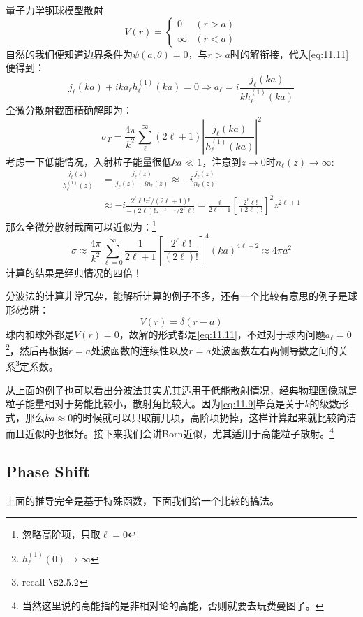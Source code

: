 \documentclass[a4paper,zihao=-4,linespread=1]{ctexrep}
\begin{document}
	\begin{example}{量子力学钢球模型散射}
		\[V(r)=\begin{cases}
			0&(r>a)\\
			\infty &(r<a)
		\end{cases}\]
		自然的我们便知道边界条件为$\psi(a,\theta)=0$，与$r>a$时的解衔接，代入\ref{eq:11.11}便得到：
		\[j_\ell(ka)+ika_\ell h^{(1)}_\ell(ka)=0\Rightarrow a_\ell=i\frac{j_\ell(ka)}{kh_\ell^{(1)}(ka)}\]
		全微分散射截面精确解即为：
		\[\sigma_T=\frac{4\pi}{k^2}\sum_\ell^\infty(2\ell+1)\left|\frac{j_\ell(ka)}{h_\ell^{(1)}(ka)}\right|^2\]
		考虑一下低能情况，入射粒子能量很低$ka\ll1$，注意到$z\to 0$时$n_\ell(z)\to\infty$:
		\begin{equation*}
			\begin{aligned}
				\frac{j_{\ell}(z)}{h_{\ell}^{(1)}(z)} & =\frac{j_{\ell}(z)}{j_{\ell}(z)+i n_{\ell}(z)} \approx-i \frac{j_{\ell}(z)}{n_{\ell}(z)} \\
				& \approx-i \frac{2^{\ell} \ell ! z^{\ell} /(2 \ell+1) !}{-(2 \ell) ! z^{-\ell-1} / 2^{\ell} \ell !}=\frac{i}{2 \ell+1}\left[\frac{2^{\ell} \ell !}{(2 \ell) !}\right]^{2} z^{2 \ell+1}
			\end{aligned}
		\end{equation*}
		那么全微分散射截面可以近似为：\footnote{忽略高阶项，只取$\ell=0$}
		\[\sigma \approx \frac{4 \pi}{k^{2}} \sum_{\ell=0}^{\infty} \frac{1}{2 \ell+1}\left[\frac{2^{\ell} \ell !}{(2 \ell) !}\right]^{4}(k a)^{4 \ell+2}\approx4\pi a^2
		\]
		计算的结果是经典情况的四倍！
	\end{example}
	分波法的计算非常冗杂，能解析计算的例子不多，还有一个比较有意思的例子是球形$\delta$势阱：
	\[V(r)=\delta(r-a)\]
	球内和球外都是$V(r)=0$，故解的形式都是\ref{eq:11.11}，不过对于球内问题$a_\ell=0$\footnote{$h^{(1)}_\ell(0)\to\infty$}，然后再根据$r=a$处波函数的连续性以及$r=a$处波函数左右两侧导数之间的关系\footnote{recall $\S 2.5.2$}定系数。
	
	从上面的例子也可以看出分波法其实尤其适用于低能散射情况，经典物理图像就是粒子能量相对于势能比较小，散射角比较大。因为\ref{eq:11.9}毕竟是关于$k$的级数形式，那么$ka\approx 0$的时候就可以只取前几项，高阶项扔掉，这样计算起来就比较简洁而且近似的也很好。接下来我们会讲Born近似，尤其适用于高能粒子散射。\footnote{当然这里说的高能指的是非相对论的高能，否则就要去玩费曼图了。}
	
	\subsection{Phase Shift}
	上面的推导完全是基于特殊函数，下面我们给一个比较的搞法。
	
\end{document}
